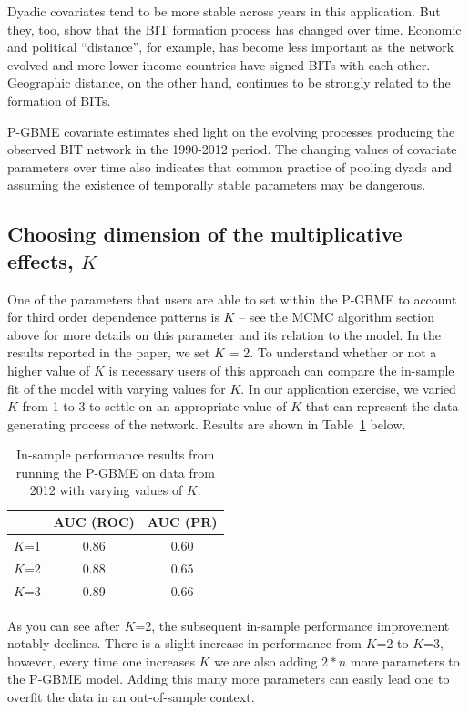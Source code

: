 \documentclass[a4paper, 12pt]{article}
\begin{document}
Dyadic covariates tend to be more stable across years in this application.  But they, too, show that the BIT formation process has changed over time.  Economic and political ``distance'', for example, has become less important as the network evolved and more lower-income countries have signed BITs with each other.  Geographic distance, on the other hand, continues to be strongly related to the formation of BITs.

P-GBME covariate estimates shed light on the evolving processes producing the observed BIT network in the 1990-2012 period.  The changing values of covariate parameters over time also indicates that common practice of pooling dyads and assuming the existence of temporally stable parameters may be dangerous.

\subsection{Choosing dimension of the multiplicative effects, $K$}

One of the parameters that users are able to set within the P-GBME to account for third order dependence patterns is $K$ -- see the MCMC algorithm section above for more details on this parameter and its relation to the model. In the results reported in the paper, we set $K$ = 2. To understand whether or not a higher value of $K$ is necessary users of this approach can compare the in-sample fit of the model with varying values for $K$. In our application exercise, we varied $K$ from 1 to 3 to settle on an appropriate value of $K$ that can represent the data generating process of the network. Results are shown in Table~\ref{tab:kvar} below.

\begin{table}[ht]
\centering
\caption{In-sample performance results from running the P-GBME on data from 2012 with varying values of $K$.}
\label{tab:kvar}
\begin{tabular}{lcc}
\toprule
~ & AUC (ROC) & AUC (PR) \\
\midrule
  $K$=1 & 0.86 & 0.60 \\
  $K$=2 & 0.88 & 0.65 \\
  $K$=3 & 0.89 & 0.66 \\ 
\bottomrule
\end{tabular}
\end{table}

As you can see after $K$=2, the subsequent in-sample performance improvement notably declines. There is a slight increase in performance from $K$=2 to $K$=3, however, every time one increases $K$ we are also adding $2*n$ more parameters to the P-GBME model. Adding this many more parameters can easily lead one to overfit the data in an out-of-sample context. 

\singlespacing
\clearpage


\end{document}

